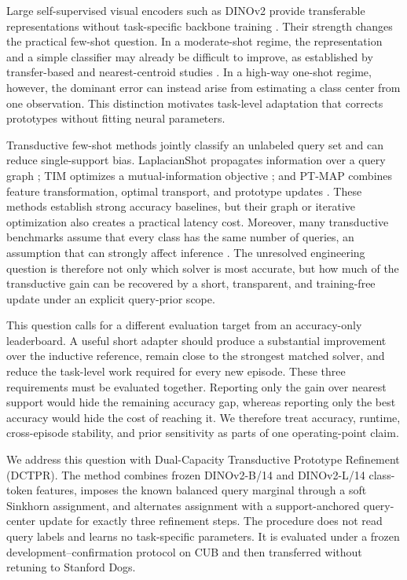 \documentclass[10pt,twocolumn]{article}
\newcommand{\method}{\textsc{DCTPR}\xspace}
\begin{document}
Large self-supervised visual encoders such as DINOv2 provide transferable
representations without task-specific backbone training \cite{dinov2}. Their
strength changes the practical few-shot question. In a moderate-shot regime,
the representation and a simple classifier may already be difficult to improve,
as established by transfer-based and nearest-centroid studies
\cite{closerlook,goodembedding,simpleshot}.
In a high-way one-shot regime, however, the dominant error can instead arise
from estimating a class center from one observation. This distinction motivates
task-level adaptation that corrects prototypes without fitting neural parameters.

Transductive few-shot methods jointly classify an unlabeled query set and can
reduce single-support bias. LaplacianShot propagates information over a query
graph \cite{laplacianshot}; TIM optimizes a mutual-information objective
\cite{tim}; and PT-MAP combines feature transformation, optimal transport, and
prototype updates \cite{ptmap}. These methods establish strong accuracy
baselines, but their graph or iterative optimization also creates a practical
latency cost. Moreover, many transductive benchmarks assume that every class has
the same number of queries, an assumption that can strongly affect inference
\cite{realistictransduction}. The unresolved engineering question is therefore
not only which solver is most accurate, but how much of the transductive gain can
be recovered by a short, transparent, and training-free update under an explicit
query-prior scope.

This question calls for a different evaluation target from an accuracy-only
leaderboard. A useful short adapter should produce a substantial improvement
over the inductive reference, remain close to the strongest matched solver,
and reduce the task-level work required for every new episode. These three
requirements must be evaluated together. Reporting only the gain over nearest
support would hide the remaining accuracy gap, whereas reporting only the best
accuracy would hide the cost of reaching it. We therefore treat accuracy,
runtime, cross-episode stability, and prior sensitivity as parts of one
operating-point claim.

We address this question with Dual-Capacity Transductive Prototype Refinement
(\method). The method combines frozen DINOv2-B/14 and DINOv2-L/14 class-token
features, imposes the known balanced query marginal through a soft Sinkhorn
assignment, and alternates assignment with a support-anchored query-center
update for exactly three refinement steps. The procedure does not read query
labels and learns no task-specific parameters. It is evaluated under a frozen
development--confirmation protocol on CUB and then transferred without retuning
to Stanford Dogs.
\end{document}
